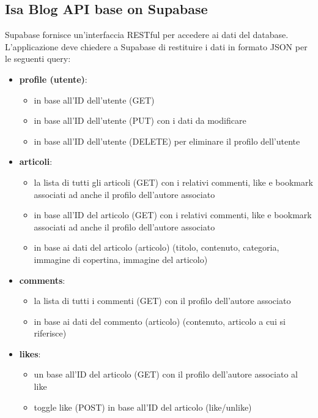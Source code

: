 \documentclass{article}
\begin{document}
    \subsection{Isa Blog API base on Supabase}

    Supabase fornisce un'interfaccia RESTful per accedere ai dati del database.
    L'applicazione deve chiedere a Supabase di restituire i dati in formato JSON per le seguenti query:

    \begin{itemize}
        \item \textbf{profile (utente)}:
        \begin{itemize}
            \item in base all'ID dell'utente (GET)
            \item in base all'ID dell'utente (PUT) con i dati da modificare
            \item in base all'ID dell'utente (DELETE) per eliminare il profilo dell'utente
        \end{itemize}
        \item \textbf{articoli}:
        \begin{itemize}
            \item la lista di tutti gli articoli (GET) con i relativi commenti, like e bookmark associati ad anche il profilo dell'autore associato
            \item in base all'ID del articolo (GET) con i relativi commenti, like e bookmark associati ad anche il profilo dell'autore associato
            \item in base ai dati del articolo (articolo) (titolo, contenuto, categoria, immagine di copertina, immagine del articolo)
        \end{itemize}
        \item \textbf{comments}:
        \begin{itemize}
            \item la lista di tutti i commenti (GET) con il profilo dell'autore associato
            \item in base ai dati del commento (articolo) (contenuto, articolo a cui si riferisce)
        \end{itemize}
        \item \textbf{likes}:
        \begin{itemize}
            \item un base all'ID del articolo (GET) con il profilo dell'autore associato al like
            \item toggle like (POST) in base all'ID del articolo (like/unlike)

\end{itemize}
\end{itemize}
\end{document}
